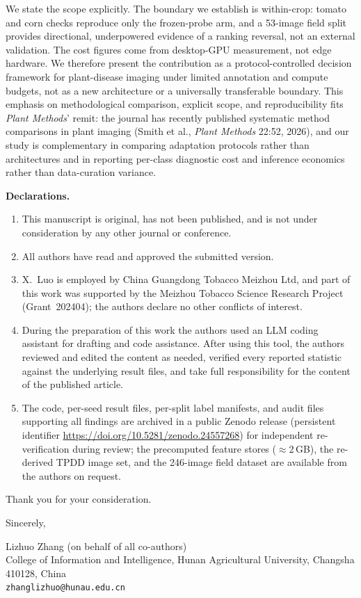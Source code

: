 \documentclass[10pt,a4paper]{article}
\begin{document}
We state the scope explicitly. The boundary we establish is within-crop: tomato and corn checks reproduce only the frozen-probe arm, and a 53-image field split provides directional, underpowered evidence of a ranking reversal, not an external validation. The cost figures come from desktop-GPU measurement, not edge hardware. We therefore present the contribution as a protocol-controlled decision framework for plant-disease imaging under limited annotation and compute budgets, not as a new architecture or a universally transferable boundary. This emphasis on methodological comparison, explicit scope, and reproducibility fits \emph{Plant Methods}' remit: the journal has recently published systematic method comparisons in plant imaging (Smith et al., \emph{Plant Methods} 22:52, 2026), and our study is complementary in comparing adaptation protocols rather than architectures and in reporting per-class diagnostic cost and inference economics rather than data-curation variance.

\noindent\textbf{Declarations.}
\begin{enumerate}
\item This manuscript is original, has not been published, and is not under consideration by any other journal or conference.
\item All authors have read and approved the submitted version.
\item X.~Luo is employed by China Guangdong Tobacco Meizhou Ltd, and part of this work was supported by the Meizhou Tobacco Science Research Project (Grant~202404); the authors declare no other conflicts of interest.
\item During the preparation of this work the authors used an LLM coding assistant for drafting and code assistance. After using this tool, the authors reviewed and edited the content as needed, verified every reported statistic against the underlying result files, and take full responsibility for the content of the published article.
\item The code, per-seed result files, per-split label manifests, and audit files supporting all findings are archived in a public Zenodo release (persistent identifier \url{https://doi.org/10.5281/zenodo.24557268}) for independent re-verification during review; the precomputed feature stores ($\approx$2\,GB), the re-derived TPDD image set, and the 246-image field dataset are available from the authors on request.
\end{enumerate}

Thank you for your consideration.

Sincerely,

Lizhuo Zhang (on behalf of all co-authors)\\
College of Information and Intelligence, Hunan Agricultural University, Changsha 410128, China\\
\texttt{zhanglizhuo@hunau.edu.cn}
\end{document}
